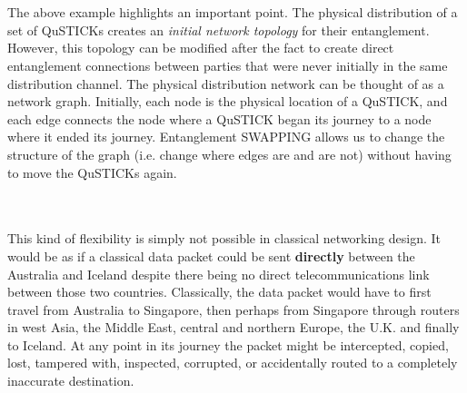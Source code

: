 \documentclass[aps,prl,twocolumn,10pt,nofootinbib]{revtex4}
\begin{document}
\\
\\
The above example highlights an important point.  The physical distribution of a set of QuSTICKs creates an {\em initial network topology} for their entanglement.  However, this topology can be modified after the fact to create direct entanglement connections between parties that were never initially in the same distribution channel.  The physical distribution network can be thought of as a network graph. Initially, each node is the physical location of a QuSTICK, and each edge connects the node where a QuSTICK began its journey to a node where it ended its journey.  Entanglement SWAPPING allows us to change the structure of the graph (i.e. change where edges are and are not) without having to move the QuSTICKs again.  
\begin{figure}[ht!]
	\caption{}
	\label{fig:SWAPPING}
\end{figure}
\\
\\
This kind of flexibility is simply not possible in classical networking design.  It would be as if a classical data packet could be sent {\bf directly} between the Australia and Iceland despite there being no direct telecommunications link between those two countries. Classically, the data packet would have to first travel from Australia to Singapore, then perhaps from Singapore through routers in west Asia, the Middle East, central and northern Europe, the U.K. and finally to Iceland.  At any point in its journey the packet might be intercepted, copied, lost, tampered with, inspected, corrupted, or accidentally routed to a completely inaccurate destination.  
\end{document}
